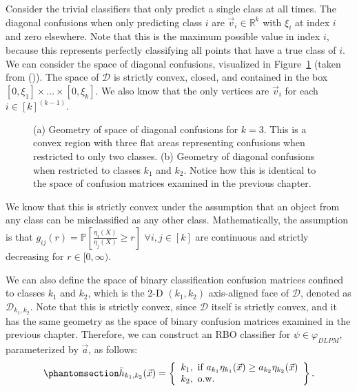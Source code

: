 \documentclass[
  letterpaper,
  numbers=noenddot,
  DIV=11]{scrreprt}
\makeatletter
\newcommand*\pandocbounded[1]{%
  \sbox\pandoc@box{#1}%
  \Gscale@div\@tempa{\textheight}{\dimexpr\ht\pandoc@box+\dp\pandoc@box\relax}%
  \Gscale@div\@tempb{\linewidth}{\wd\pandoc@box}%
  \ifdim\@tempb\p@<\@tempa\p@\let\@tempa\@tempb\fi%
  \ifdim\@tempa\p@<\p@\scalebox{\@tempa}{\usebox\pandoc@box}%
  \else\usebox{\pandoc@box}%
  \fi%
}
\theoremstyle{plain}
\theoremstyle{definition}
\theoremstyle{remark}
\makeatother
\begin{document}
Consider the trivial classifiers that only predict a single class at all
times. The diagonal confusions when only predicting class \(i\) are
\(\vec{v}_i \in \mathbb{R}^k\) with \(\xi_i\) at index \(i\) and zero
elsewhere. Note that this is the maximum possible value in index \(i\),
because this represents perfectly classifying all points that have a
true class of \(i\). We can consider the space of diagonal confusions,
visualized in Figure~\ref{fig-diag_geom} (taken from
()). The
space of \(\mathcal{D}\) is strictly convex, closed, and contained in
the box \([0, \xi_1] \times \dots \times [0, \xi_k]\). We also know that
the only vertices are \(\vec{v}_i\) for each \(i \in [k]^{(k-1)}\).

\begin{figure}

\centering{

\pandocbounded{\texttt{[image: src/Figures/diag\_geometry.png]}}

}

\caption{\label{fig-diag_geom}(a) Geometry of space of diagonal
confusions for \(k=3\). This is a convex region with three flat areas
representing confusions when restricted to only two classes. (b)
Geometry of diagonal confusions when restricted to classes \(k_1\) and
\(k_2\). Notice how this is identical to the space of confusion matrices
examined in the previous chapter.}

\end{figure}%

We know that this is strictly convex under the assumption that an object
from any class can be misclassified as any other class. Mathematically,
the assumption is that
\(g_{ij}(r) = \mathbb{P} \left[\frac{\eta_i(X)}{\eta_j(X)} \geq r \right]\)
\(\forall i, j \in [k]\) are continuous and strictly decreasing for
\(r \in [0, \infty)\).

We can also define the space of binary classification confusion matrices
confined to classes \(k_1\) and \(k_2\), which is the 2-D \((k_1, k_2)\)
axis-aligned face of \(\mathcal{D}\), denoted as
\(\mathcal{D}_{k_1, k_2}\). Note that this is strictly convex, since
\(\mathcal{D}\) itself is strictly convex, and it has the same geometry
as the space of binary confusion matrices examined in the previous
chapter. Therefore, we can construct an RBO classifier for
\(\psi \in \varphi_{DLPM}\), parameterized by \(\vec{a}\), as follows:
\begin{equation}\phantomsection\label{eq-rbo_eq}{\begin{aligned}
\bar{h}_{k_1, k_2}(\vec{x})= \left\{
\begin{array}{ll}
      k_1, \text{ if } a_{k_1} \eta_{k_1}(\vec{x}) \geq a_{k_2} \eta_{k_2}(\vec{x})\\
k_2, \text{ o.w.}
\end{array}
\right\}.
\end{aligned}}\end{equation}
\end{document}
